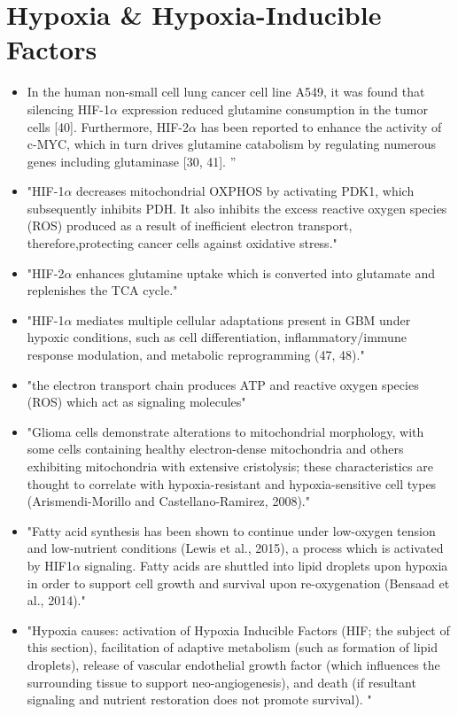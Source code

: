 \documentclass[11pt,a4paper]{article}
\begin{document}
\section{Hypoxia \& Hypoxia-Inducible Factors}
\begin{itemize}
\item In the human non-small cell lung cancer cell line A549, it was found that silencing HIF-1$\alpha$ expression reduced glutamine consumption in the tumor cells [40]. Furthermore, HIF-2$\alpha$ has been reported to enhance the activity of c-MYC, which in turn drives glutamine catabolism by regulating numerous genes including glutaminase [30, 41]. ”\cite{Ma2022}
\item "HIF-1$\alpha$ decreases mitochondrial OXPHOS by activating PDK1, which subsequently inhibits PDH. It also inhibits the excess reactive oxygen species (ROS) produced as a result of inefficient electron transport, therefore,protecting cancer cells against oxidative stress."\cite{Mudassar2020}
\item "HIF-2$\alpha$ enhances glutamine uptake which is
converted into glutamate and replenishes the TCA cycle." \cite{Mudassar2020}
\item "HIF-1$\alpha$ mediates multiple cellular adaptations present in GBM under hypoxic conditions, such as cell differentiation, inflammatory/immune response modulation, and metabolic reprogramming (47, 48)." \cite{Chen2021}
\item "the electron transport chain produces ATP and reactive oxygen species (ROS) which act as signaling molecules"\cite{Strickland2017}
\item "Glioma cells demonstrate alterations to mitochondrial morphology, with some cells containing healthy electron-dense mitochondria and others exhibiting mitochondria with extensive cristolysis; these characteristics are thought to correlate with hypoxia-resistant and hypoxia-sensitive cell types (Arismendi-Morillo and Castellano-Ramirez, 2008)."
\item "Fatty acid synthesis has been shown to continue under low-oxygen tension and low-nutrient conditions (Lewis et al., 2015), a process which is activated by HIF1$\alpha$ signaling. Fatty acids are shuttled into lipid droplets upon hypoxia in order to support cell growth and survival upon re-oxygenation (Bensaad et al., 2014)."\cite{Strickland2017}
\item "Hypoxia causes: activation of Hypoxia Inducible Factors (HIF; the subject of this section), facilitation of adaptive metabolism (such as formation of lipid droplets), release of vascular endothelial growth factor (which influences the surrounding tissue to support neo-angiogenesis), and death (if resultant signaling and nutrient restoration does not promote survival). " \cite{Strickland2017}

\end{itemize}
\end{document}

